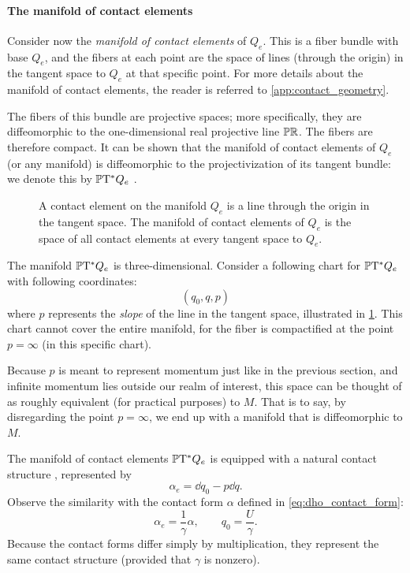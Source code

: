 \paragraph{The manifold of contact elements} Consider now the \emph{manifold of contact elements} of \(Q_e\). This is a fiber bundle with base \(Q_e\), and the fibers at each point are the space of lines (through the origin) in the tangent space to \(Q_e\) at that specific point. For more details about the manifold of contact elements, the reader is referred to \cref{app:contact_geometry}.

The fibers of this bundle are projective spaces; more specifically, they are diffeomorphic to the one-dimensional real projective line \(\mathbb{P}\mathbb{R}\). The fibers are therefore compact. It can be shown that the manifold of contact elements of \(Q_e\) (or any manifold) is diffeomorphic to the projectivization of its tangent bundle: we denote this by \(\mathbb{P}\mathrm{T}^* Q_e\) \cite{Cannas2001,Arnold1989,Libermann1987}.

\begin{figure}
    \centering
    
    \caption{A contact element on the manifold \(Q_e\) is a line through the origin in the tangent space. The manifold of contact elements of \(Q_e\) is the space of all contact elements at every tangent space to \(Q_e\).}
    \label{fig:manifold_contact_elements}
\end{figure}

The manifold \(\mathbb{P}\mathrm{T}^* Q_e\) is three-dimensional. Consider a following chart for \(\mathbb{P}\mathrm{T}^* Q_e\) with following coordinates:
\begin{equation}
     (q_0, q, p)
\end{equation}
where \(p\) represents the \emph{slope} of the line in the tangent space, illustrated in \cref{fig:manifold_contact_elements}. This chart cannot cover the entire manifold, for the fiber is compactified at the point \(p = \infty\) (in this specific chart). 

Because \(p\) is meant to represent momentum just like in the previous section, and infinite momentum lies outside our realm of interest, this space can be thought of as roughly equivalent (for practical purposes) to \(M\). That is to say, by disregarding the point \(p = \infty\), we end up with a manifold that is diffeomorphic to \(M\).

The manifold of contact elements \(\mathbb{P}\mathrm{T}^* Q_e\) is equipped with a natural contact structure \cite{Arnold1989}, represented by
\begin{equation}
    \alpha_e = \dd{q}_0 - p\dd{q}.
\end{equation}
Observe the similarity with the contact form \(\alpha\) defined in \cref{eq:dho_contact_form}: 
\begin{equation}
     \alpha_e = \frac{1}{\gamma}\alpha, \qquad q_0 = \frac{U}{\gamma}.
\end{equation}
Because the contact forms differ simply by multiplication, they represent the same contact structure (provided that \(\gamma\) is nonzero).

